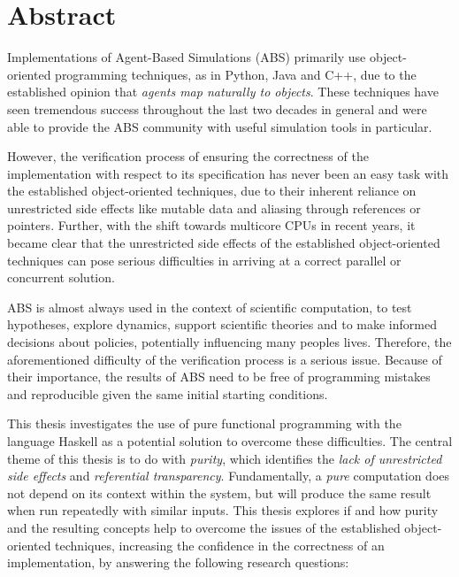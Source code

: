 \section*{Abstract}
Implementations of Agent-Based Simulations (ABS) primarily use object- \\ oriented programming techniques, as in Python, Java and C++, due to the established opinion that \textit{agents map naturally to objects}. These techniques have seen tremendous success throughout the last two decades in general and were able to provide the ABS community with useful simulation tools in particular.

However, the verification process of ensuring the correctness of the implementation with respect to its specification has never been an easy task with the established object-oriented techniques, due to their inherent reliance on unrestricted side effects like mutable data and aliasing through references or pointers.
Further, with the shift towards multicore CPUs in recent years, it became clear that the unrestricted side effects of the established object-oriented techniques can pose serious difficulties in arriving at a correct parallel or concurrent solution.

ABS is almost always used in the context of scientific computation, to test hypotheses, explore dynamics, support scientific theories and to make informed decisions about policies, potentially influencing many peoples lives. Therefore, the aforementioned difficulty of the verification process is a serious issue. Because of their importance, the results of ABS need to be free of programming mistakes and reproducible given the same initial starting conditions.

\medskip

This thesis investigates the use of pure functional programming with the language Haskell as a potential solution to overcome these difficulties. The central theme of this thesis is to do with \textit{purity}, which identifies the \textit{lack of unrestricted side effects} and \textit{referential transparency}. Fundamentally, a \textit{pure} computation does not depend on its context within the system, but will produce the same result when run repeatedly with similar inputs. This thesis explores if and how purity and the resulting concepts help to overcome the issues of the established object-oriented techniques, increasing the confidence in the correctness of an implementation, by answering the following research questions:

